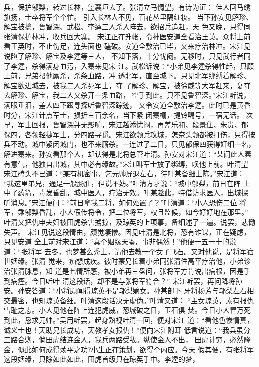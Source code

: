 兵，保护邬梨，转过长林，望襄垣去了。张清立马惆望，有诗为证：
佳人回马绣旗扬，士卒将军个个忙。
引入长林人不见，百花丛里隔红妆。
当下孙安见解珍、解宝被擒，鲁智深、武松、李逵三人杀入阵去，欲招兵追赶，天
色又晚，只得同张清保护林冲，收兵回大寨。
宋江正在升帐，令神医安道全看治王英。众将上前看王英时，不止伤足，连头面也
磕破。安道全敷治已毕，又来疗治林冲。宋江见说陷了解珍、解宝及李逵等三人，
不知下落，十分忧闷。无移时，只见武行者同了李逵，杀得满身血污，入寨来见宋
江。武松诉说：“小弟见李逵杀得性起，只顾上前，兄弟帮他厮杀，杀条血路，冲
透北军，直至城下。只见北军绑缚着解珍、解宝欲进城去，被我二人杀死军士，夺
了解珍、解宝，被徐威等大军赶来，复夺去解珍、解宝，我二人又杀开一条血路，
空手到此。只不见鲁智深。”宋江听说，满眼垂泪，差人四下跟寻探听鲁智深踪迹，
又令安道全敷治李逵。此时已是黄昏时分，宋江计点军士，损折三百余名，当下紧
闭寨栅，提铃喝号，一宿无话。
次早，军士回报，鲁智深并无影响，宋江越添忧闷，再差乐和、段景住、朱贵、郁
保四，各领轻捷军士，分四路寻觅。宋江欲领兵攻城，怎奈头领都被打伤，只得按
兵不动。城中紧闭城门，也不来厮杀。一连过了二日，只见郁保四获得奸细一名，
解进寨来。孙安看那个人，却认得是北将总管叶清。孙安对宋江道：“某闻此人素
有意气，他独自出城，其中必有缘故。”宋江叫军士放了绑缚，唤他上前。叶清望
宋江磕头不已道：“某有机密事，乞元帅屏退左右，待叶某备细上陈。”宋江道：
“我这里弟兄，通是一般肠肚，但说不妨。”叶清方才说：“城中邬梨，前日在阵
上中了药箭，毒发昏乱，城中医人，疗治无效。叶某趁此，特借访求医人，出城探
听消息。”宋江便问：“前日拿我二将，如何处置了？”叶清道：“小人恐伤二位
将军，乘邬梨昏乱，小人假传将令，把二位将军，权且监候，如今好好地在那里。”
叶清又把仇申夫妇被田虎杀害掳掠，及琼英的上项事，备细述了一遍。说罢，悲恸
失声。
宋江见说这段情由，颇觉凄惨。因见叶清是北将，恐有诈谋，正在疑虑，只见安道
全上前对宋江道：“真个姻缘天凑，事非偶然！”他便一五一十的说道：“张将军
去冬，也梦甚么秀士，请他去教一个女子飞石。又对他说，是将军宿世姻缘。张清
觉来，痴想成疾。彼时蒙兄长着小弟同张清住高平疗治他，小弟诊治张清脉息，知
道是七情所感，被小弟再三盘问，张将军方肯说出病根，因是手到病痊。今日听叶
清这段话，却不是与张将军符合？”
宋江听罢，再问降将孙安。孙安答道：“小将颇闻得琼英不是邬梨嫡女。孙某部下
牙将杨芳与邬梨左右相交最密，也知琼英备细。叶清这段话决无虚伪。”叶清又道：
“主女琼英，素有报仇雪耻之志。小人见他在阵上连犯虎威，恐城破之日，玉石俱
焚。今日小人冒万死到此，恳求元帅。”吴用听罢，起身熟视叶清一回，便对宋江
道：“看他色惨情真，诚义士也！天助兄长成功，天教孝女报仇！”便向宋江附耳
低言说道：“我兵虽分三路合剿，倘田虎结连金人，我兵两路受敌。纵使金人不出，
田虎计穷，必然降金，似此如何成得荡平之功?小生正在策划，欲得个内应。今天
假其便，有张将军这段姻缘，只除如此如此，田虎首级只在琼英手中。李逵的梦，
